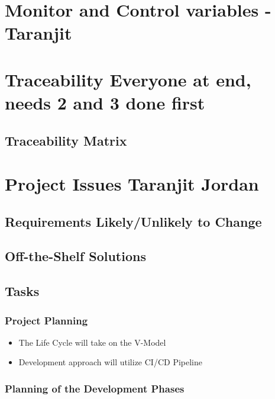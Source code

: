 \documentclass[12pt]{article}
\begin{document}
\section{Monitor and Control variables - Taranjit }

\section{Traceability  Everyone at end, needs 2 and 3 done first}
 	
\subsection{Traceability Matrix }

\section{Project Issues Taranjit Jordan}

\subsection{Requirements Likely/Unlikely to Change}

\subsection{Off-the-Shelf Solutions} 

\subsection{Tasks}

\subsubsection{Project Planning}

\begin{itemize}
  \item The Life Cycle will take on the V-Model
  \item Development approach will utilize CI/CD Pipeline
\end{itemize}

\subsubsection{Planning of the Development Phases}
\end{document}

